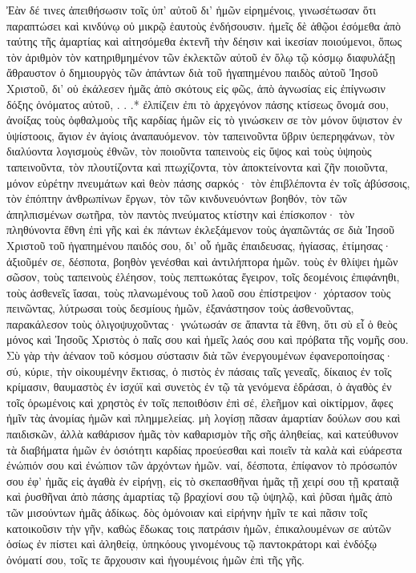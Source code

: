 Ἐὰν δέ τινες ἀπειθήσωσιν τοῖς ὑπ’ αὐτοῦ δι’ ἡμῶν εἰρημένοις, γινωσέτωσαν ὅτι παραπτώσει καὶ κινδύνῳ οὐ μικρῷ ἑαυτοὺς ἐνδήσουσιν. ἡμεῖς δὲ ἀθῷοι ἐσόμεθα ἀπὸ ταύτης τῆς ἁμαρτίας καὶ αἰτησόμεθα ἐκτενῆ τὴν δέησιν καὶ ἱκεσίαν ποιούμενοι, ὅπως τὸν ἀριθμὸν τὸν κατηριθμημένον τῶν ἐκλεκτῶν αὐτοῦ ἐν ὅλῳ τῷ κόσμῳ διαφυλάξῃ ἄθραυστον ὁ δημιουργὸς τῶν ἁπάντων διὰ τοῦ ἠγαπημένου παιδὸς αὐτοῦ Ἰησοῦ Χριστοῦ, δι’ οὑ ἐκάλεσεν ἡμᾶς ἀπὸ σκότους εἰς φῶς, ἀπὸ ἀγνωσίας εἰς ἐπίγνωσιν δόξης ὀνόματος αὐτοῦ, . . .* ἐλπίζειν ἐπι τὸ ἀρχεγόνον πάσης κτίσεως ὄνομά σου, ἀνοίξας τοὺς ὀφθαλμοὺς τῆς καρδίας ἡμῶν εἰς τὸ γινώσκειν σε τὸν μόνον ὕψιστον ἐν ὑψίστοοις, ἅγιον ἐν ἁγίοις ἀναπαυόμενον. τὸν ταπεινοῦντα ὕβριν ὑεπερηφάνων, τὸν διαλύοντα λογισμοὺς ἐθνῶν, τὸν ποιοῦντα ταπεινοὺς εἰς ὕψος καὶ τοὺς ὑψηοὺς ταπεινοῦντα, τὸν πλουτίζοντα καὶ πτωχίζοντα, τὸν ἀποκτείνοντα καὶ ζῆν ποιοῦντα, μόνον εὑρέτην πνευμάτων καὶ θεὸν πάσης σαρκός· τὸν ἐπιβλέποντα ἐν τοῖς ἀβύσσοις, τὸν ἐπόπτην ἀνθρωπίνων ἔργων, τὸν τῶν κινδυνευόντων βοηθόν, τὸν τῶν ἀπηλπισμένων σωτῆρα, τὸν παντὸς πνεύματος κτίστην καὶ ἐπίσκοπον· τὸν πληθύνοντα ἔθνη ἐπὶ γῆς καὶ ἐκ πάντων ἐκλεξάμενον τοὺς ἀγαπῶντάς σε διὰ Ἰησοῦ Χριστοῦ τοῦ ἠγαπημένου παιδός σου, δι’ οὗ ἡμᾶς ἐπαιδευσας, ἡγίασας, ἐτίμησας· ἀξιοῦμέν σε, δέσποτα, βοηθὸν γενέσθαι καὶ ἀντιλήπτορα ἡμῶν. τοὺς ἐν θλίψει ἡμῶν σῶσον, τοὺς ταπεινοὺς ἐλέησον, τοὺς πεπτωκότας ἔγειρον, τοῖς δεομένοις ἐπιφάνηθι, τοὺς ἀσθενεῖς ἴασαι, τοὺς πλανωμένους τοῦ λαοῦ σου ἐπίστρεψον· χόρτασον τοὺς πεινῶντας, λύτρωσαι τοὺς δεσμίους ἡμῶν, ἐξανάστησον τοὺς ἀσθενοῦντας, παρακάλεσον τοὺς ὀλιγοψυχοῦντας· γνώτωσάν σε ἅπαντα τὰ ἔθνη, ὅτι σὺ εἶ ὁ θεὸς μόνος καὶ Ἰησοῦς Χριστὸς ὁ παῖς σου καὶ ἡμεῖς λαός σου καὶ πρόβατα τῆς νομῆς σου.
Σὺ γὰρ τὴν ἀέναον τοῦ κόσμου σύστασιν διὰ τῶν ἐνεργουμένων ἐφανεροποίησας· σύ, κύριε, τὴν οἰκουμένην ἔκτισας, ὁ πιστὸς ἐν πάσαις ταῖς γενεαῖς, δίκαιος ἐν τοῖς κρίμασιν, θαυμαστὸς ἐν ἰσχύϊ καὶ συνετὸς ἐν τῷ τὰ γενόμενα ἑδράσαι, ὁ ἀγαθὸς ἐν τοῖς ὁρωμένοις καὶ χρηστὸς ἐν τοῖς πεποιθόσιν ἐπὶ σέ, ἐλεῆμον καὶ οἰκτίρμον, ἄφες ἡμῖν τὰς ἀνομίας ἡμῶν καὶ πλημμελείας. μὴ λογίσῃ πᾶσαν ἁμαρτίαν δούλων σου καὶ παιδισκῶν, ἀλλὰ καθάρισον ἡμᾶς τὸν καθαρισμὸν τῆς σῆς ἀληθείας, καὶ κατεύθυνον τὰ διαβήματα ἡμῶν ἐν ὁσιότητι καρδίας προεύεσθαι καὶ ποιεῖν τὰ καλὰ καὶ εὐάρεστα ἐνώπιόν σου καὶ ἐνώπιον τῶν ἀρχόντων ἡμῶν. ναί, δέσποτα, ἐπίφανον τὸ πρόσωπόν σου ἐφ’ ἡμᾶς εἰς ἀγαθὰ ἐν εἰρήνῃ, εἰς τὸ σκεπασθῆναι ἡμᾶς τῇ χειρί σου τῇ κραταιᾷ καὶ ῥυσθῆναι ἀπὸ πάσης ἁμαρτίας τῷ βραχίονί σου τῷ ὑψηλῷ, καὶ ῥῦσαι ἡμᾶς ἀπὸ τῶν μισούντων ἡμᾶς ἀδίκως. δὸς ὁμόνοιαν καὶ εἰρήνην ἡμῖν τε καὶ πᾶσιν τοῖς κατοικοῦσιν τὴν γῆν, καθὼς ἔδωκας τοις πατράσιν ἡμῶν, ἐπικαλουμένων σε αὐτῶν ὁσίως ἐν πίστει καὶ ἀληθείᾳ, ὑπηκόους γινομένους τῷ παντοκράτορι καὶ ἐνδόξῳ ὀνόματί σου, τοῖς τε ἄρχουσιν καὶ ἡγουμένοις ἡμῶν ἐπὶ τῆς γῆς.
